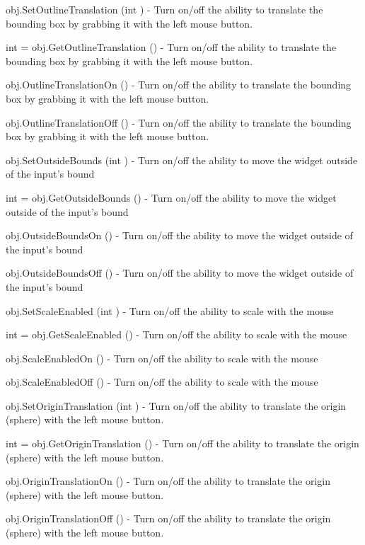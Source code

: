 \begin{DoxyItemize}
\item {\ttfamily obj.\-Set\-Outline\-Translation (int )} -\/ Turn on/off the ability to translate the bounding box by grabbing it with the left mouse button.  
\item {\ttfamily int = obj.\-Get\-Outline\-Translation ()} -\/ Turn on/off the ability to translate the bounding box by grabbing it with the left mouse button.  
\item {\ttfamily obj.\-Outline\-Translation\-On ()} -\/ Turn on/off the ability to translate the bounding box by grabbing it with the left mouse button.  
\item {\ttfamily obj.\-Outline\-Translation\-Off ()} -\/ Turn on/off the ability to translate the bounding box by grabbing it with the left mouse button.  
\item {\ttfamily obj.\-Set\-Outside\-Bounds (int )} -\/ Turn on/off the ability to move the widget outside of the input's bound  
\item {\ttfamily int = obj.\-Get\-Outside\-Bounds ()} -\/ Turn on/off the ability to move the widget outside of the input's bound  
\item {\ttfamily obj.\-Outside\-Bounds\-On ()} -\/ Turn on/off the ability to move the widget outside of the input's bound  
\item {\ttfamily obj.\-Outside\-Bounds\-Off ()} -\/ Turn on/off the ability to move the widget outside of the input's bound  
\item {\ttfamily obj.\-Set\-Scale\-Enabled (int )} -\/ Turn on/off the ability to scale with the mouse  
\item {\ttfamily int = obj.\-Get\-Scale\-Enabled ()} -\/ Turn on/off the ability to scale with the mouse  
\item {\ttfamily obj.\-Scale\-Enabled\-On ()} -\/ Turn on/off the ability to scale with the mouse  
\item {\ttfamily obj.\-Scale\-Enabled\-Off ()} -\/ Turn on/off the ability to scale with the mouse  
\item {\ttfamily obj.\-Set\-Origin\-Translation (int )} -\/ Turn on/off the ability to translate the origin (sphere) with the left mouse button.  
\item {\ttfamily int = obj.\-Get\-Origin\-Translation ()} -\/ Turn on/off the ability to translate the origin (sphere) with the left mouse button.  
\item {\ttfamily obj.\-Origin\-Translation\-On ()} -\/ Turn on/off the ability to translate the origin (sphere) with the left mouse button.  
\item {\ttfamily obj.\-Origin\-Translation\-Off ()} -\/ Turn on/off the ability to translate the origin (sphere) with the left mouse button.  

\end{DoxyItemize}
